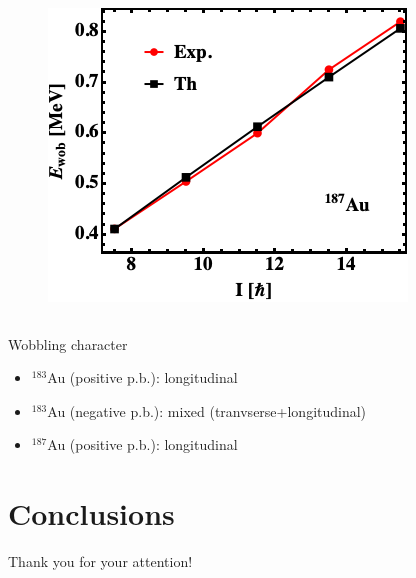 \documentclass{beamer}
\begin{document}
\begin{frame}
\begin{columns}
\begin{column}{.33\textwidth}
\begin{figure}
        \centering
        \includegraphics[scale=0.3]{figs/wobbling_187.png}
    \end{figure}
    \end{column}
    \end{columns}
    \begin{alertblock}{Wobbling character}
    \begin{itemize}
        \item $^{183}$Au (positive p.b.): longitudinal
        \item $^{183}$Au (negative p.b.): mixed (tranvserse+longitudinal)
        \item $^{187}$Au (positive p.b.): longitudinal
    \end{itemize}
    \end{alertblock}
\end{frame}
\section{Conclusions}



  \begin{frame}
  \centering
    \Large{Thank you for your attention!}
  \end{frame}
\end{document}
